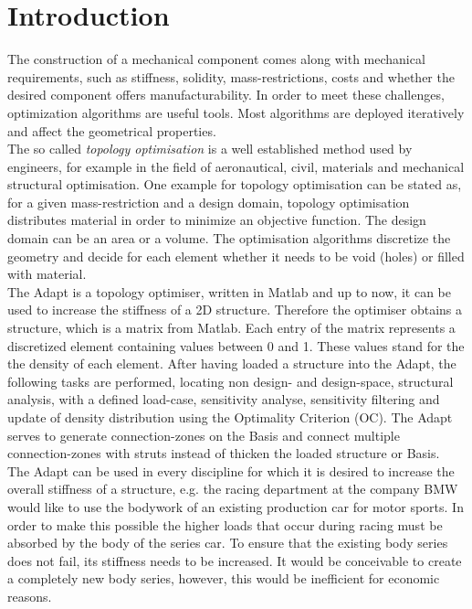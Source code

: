 \chapter{Introduction}

The construction of a mechanical component comes along with mechanical requirements, such as
stiffness, solidity, mass-restrictions, costs and
whether the desired component offers manufacturability.
In order to meet these challenges, optimization algorithms are useful tools. 
Most algorithms are deployed iteratively and affect the
geometrical properties.\\

The so called \emph{topology optimisation} is a well established method
used by engineers,
for example in the field of aeronautical, civil, materials and mechanical structural optimisation.
One example for
topology optimisation can be
stated as, for a given mass-restriction and a 
design domain, topology optimisation distributes
 material in order to minimize an objective function.
 The design domain can be an area  or a volume.
The optimisation algorithms discretize
the geometry and decide for each
element whether it needs to be void (holes) or filled with material.\\

The Adapt is a topology optimiser, written in Matlab and up to now,
it can be used to increase the stiffness of a 2D structure.
Therefore the optimiser obtains a
structure, which is a matrix from Matlab.
Each entry of the matrix represents a discretized element 
containing values between 0 and 1.
These values stand for the the density of each element.
After having loaded a structure into
the Adapt, the following tasks
are performed, locating non design- and design-space,
structural analysis, with a defined load-case, sensitivity analyse,
sensitivity filtering and update of
density distribution using the Optimality Criterion (OC). The Adapt serves
to generate connection-zones on the Basis and connect
multiple connection-zones with
struts instead of thicken the loaded structure or Basis. \\

The Adapt can be used in every discipline for which it is desired
to increase the overall stiffness of a structure, e.g.
the racing department at the company BMW would like to use the bodywork of an existing production
car for motor sports. In order to make this possible
the higher loads that occur during racing must
be  absorbed by the body of the series car.
To ensure that the existing body series does not fail,
its stiffness needs to be increased.
It would be conceivable to create a completely new
body series, however, this would be inefficient for economic reasons.\\

